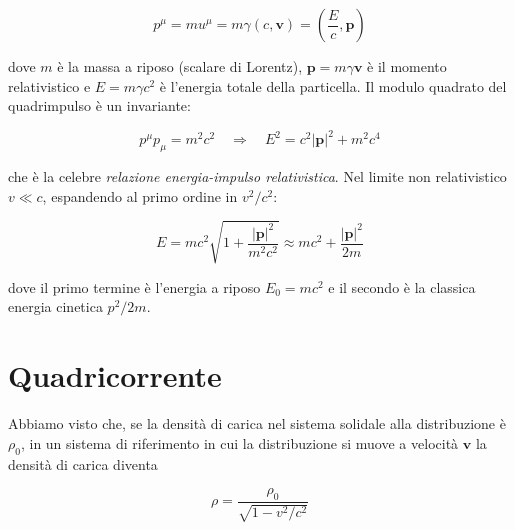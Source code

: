 \begin{tcolorbox}[colback=yellow!10!white, colframe=orange!70!black, boxrule=0.8pt]
\begin{equation}\label{eq: quadrimpulso}
    p^\mu = mu^\mu = m\gamma(c, \mathbf{v}) = \left(\frac{E}{c}, \mathbf{p}\right)
\end{equation}
\end{tcolorbox}

dove $m$ è la massa a riposo (scalare di Lorentz), $\mathbf{p} = m\gamma\mathbf{v}$ è il momento relativistico e $E = m\gamma c^2$ è l'energia totale della particella. 
Il modulo quadrato del quadrimpulso è un invariante:

\begin{tcolorbox}[colback=yellow!10!white, colframe=orange!70!black, boxrule=0.8pt]
\begin{equation}\label{eq: relazione_energia_impulso}
    p^\mu p_\mu = m^2c^2 \quad \Rightarrow \quad E^2 = c^2|\mathbf{p}|^2 + m^2c^4
\end{equation}
\end{tcolorbox}

che è la celebre \emph{relazione energia-impulso relativistica}.  
Nel limite non relativistico $v \ll c$, espandendo al primo ordine in $v^2/c^2$:

\begin{equation}
    E = mc^2\sqrt{1 + \frac{|\mathbf{p}|^2}{m^2c^2}} \approx mc^2 + \frac{|\mathbf{p}|^2}{2m}
\end{equation}

dove il primo termine è l'energia a riposo $E_0 = mc^2$ e il secondo è la classica energia cinetica $p^2/2m$.

\section{Quadricorrente}

Abbiamo visto che, se la densità di carica nel sistema solidale alla distribuzione è $\rho_0$, in un sistema di riferimento in cui la distribuzione si muove a velocità $\mathbf{v}$ la densità di carica diventa 

\begin{tcolorbox}[colback=yellow!10!white, colframe=orange!70!black, boxrule=0.8pt]
\begin{equation}
    \rho = \frac{\rho_0}{\sqrt{1 - v^2/c^2}}
\end{equation}
\end{tcolorbox}

